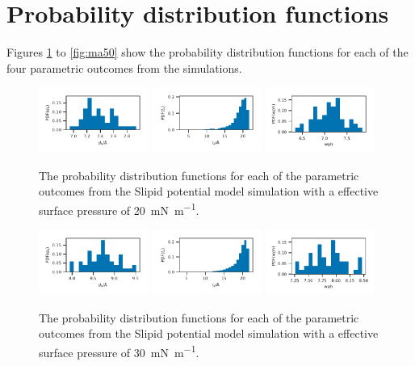 \documentclass[amsmath,amssymb,superscriptaddress]{revtex4-1}
\begin{document}
\section{Probability distribution functions}
Figures \ref{fig:sl20} to \ref{fig:ma50} show the probability distribution functions for each of the four parametric outcomes from the simulations.
%
\begin{figure}
 \centering
 \includegraphics[width=0.32\textwidth]{slipids_20_dh}
 \includegraphics[width=0.32\textwidth]{slipids_20_tt}
 \includegraphics[width=0.32\textwidth]{slipids_20_wph}
 \caption{The probability distribution functions for each of the parametric outcomes from the Slipid potential model simulation with a effective surface pressure of \SI{20}{\milli\newton\per\meter}.}
 \label{fig:sl20}
\end{figure}
%
%
\begin{figure}
 \centering
 \includegraphics[width=0.32\textwidth]{slipids_30_dh}
 \includegraphics[width=0.32\textwidth]{slipids_30_tt}
 \includegraphics[width=0.32\textwidth]{slipids_30_wph}
 \caption{The probability distribution functions for each of the parametric outcomes from the Slipid potential model simulation with a effective surface pressure of \SI{30}{\milli\newton\per\meter}.}
 \label{fig:sl30}
\end{figure}
\end{document}
